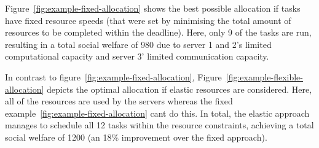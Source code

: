 Figure~\ref{fig:example-fixed-allocation} shows the best possible allocation if tasks have fixed resource speeds (that
were set by minimising the total amount of resources to be completed within the deadline). Here, only 9 of the tasks
are run, resulting in a total social welfare of 980 due to server 1 and 2's limited computational capacity and server
3' limited communication capacity.

In contrast to figure~\ref{fig:example-fixed-allocation}, Figure~\ref{fig:example-flexible-allocation} depicts the
optimal allocation if elastic resources are considered. Here, all of the resources are used by the servers whereas the
fixed example~\ref{fig:example-fixed-allocation} cant do this. In total, the elastic approach manages to schedule all
12 tasks within the resource constraints, achieving a total social welfare of 1200 (an 18\% improvement over the fixed
approach).